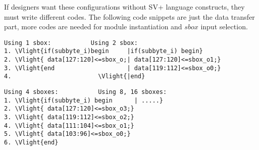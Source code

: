 If designers want these configurations without SV+ language constructs, they must write different codes. The following code snippets are just the data transfer part, more codes are needed for module instantiation and $sbox$ input selection.
\begin{Verbatim}[commandchars=\\\{\}]
   Using 1 sbox:           Using 2 sbox:
1. \Vlight{if(subbyte_i)begin     |if(subbyte_i) begin}
2. \Vlight{ data[127:120]<=sbox_o;| data[127:120]<=sbox_o1;}
3. \Vlight{end                    | data[119:112]<=sbox_o0;}
4.                        \Vlight{|end}
\end{Verbatim}
\begin{Verbatim}[commandchars=\\\{\}]
   Using 4 sboxes:           Using 8, 16 sboxes:
1. \Vlight{if(subbyte_i) begin      | .....}
2. \Vlight{ data[127:120]<=sbox_o3;}
3. \Vlight{ data[119:112]<=sbox_o2;}
4. \Vlight{ data[111:104]<=sbox_o1;}
5. \Vlight{ data[103:96]<=sbox_o0;}
6. \Vlight{end}
\end{Verbatim}
